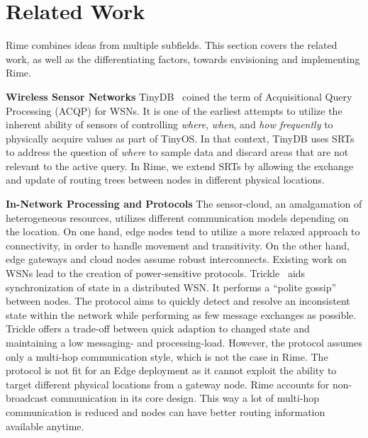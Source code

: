 \section{Related Work}
\label{sec:related-work}
Rime combines ideas from multiple subfields. This section covers the related 
work, as well as the differentiating factors, towards envisioning and implementing Rime.

\textbf{Wireless Sensor Networks} TinyDB~\cite{madden2005tinydb} coined the term of Acquisitional Query Processing (ACQP) for WSNs. It is one of the earliest attempts to utilize the inherent ability of sensors of controlling \textit{where}, \textit{when}, and \textit{how frequently} to physically acquire values as part of TinyOS. In that context, TinyDB uses SRTs to address the question of \textit{where} to sample data and discard areas that are not relevant to the active query. In Rime, we extend SRTs by allowing the exchange and update of routing trees between nodes in different physical locations.

\textbf{In-Network Processing and Protocols} The sensor-cloud, an amalgamation of heterogeneous resources, utilizes different communication models depending on the location. On one hand, edge nodes tend to utilize a more relaxed approach to
connectivity, in order to handle movement and transitivity. On the other hand, edge gateways and cloud nodes assume robust interconnects. Existing work on WSNs lead to the creation of power-sensitive protocols. Trickle~\cite{levis2008emergence} aids synchronization of state in a distributed WSN. It performs a ``polite gossip'' between nodes. The protocol aims to quickly detect and resolve an inconsistent state within the network while performing as few message exchanges as possible. Trickle offers a  trade-off between quick adaption to changed state and maintaining a low messaging- and processing-load. However, the protocol assumes only a multi-hop communication style, which is not the case in Rime. The protocol is not fit for an Edge deployment as it cannot exploit the ability to target different physical locations from a gateway node. Rime accounts for non-broadcast communication in its core design. This way a lot of multi-hop communication is reduced and nodes can have better routing information available anytime.

